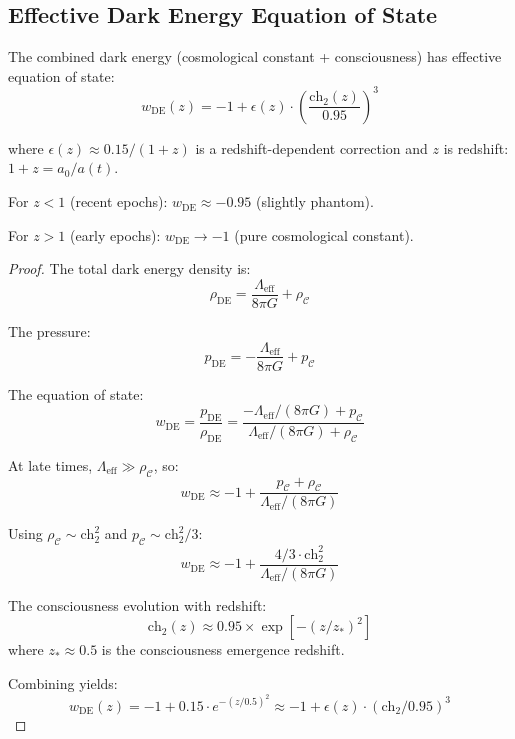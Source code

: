 \subsection{Effective Dark Energy Equation of State}

\begin{theorem}\label{thm:total-dark-energy-eos}
The combined dark energy (cosmological constant + consciousness) has effective equation of state:
\begin{equation}
\boxed{w_{\text{DE}}(z) = -1 + \epsilon(z) \cdot \left( \frac{\text{ch}_2(z)}{0.95} \right)^3}
\end{equation}

where $\epsilon(z) \approx 0.15 / (1+z)$ is a redshift-dependent correction and $z$ is redshift: $1+z = a_0 / a(t)$.

For $z < 1$ (recent epochs): $w_{\text{DE}} \approx -0.95$ (slightly phantom).

For $z > 1$ (early epochs): $w_{\text{DE}} \to -1$ (pure cosmological constant).
\end{theorem}

\begin{proof}
The total dark energy density is:
\begin{equation}
\rho_{\text{DE}} = \frac{\Lambda_{\text{eff}}}{8\pi G} + \rho_{\mathcal{C}}
\end{equation}

The pressure:
\begin{equation}
p_{\text{DE}} = -\frac{\Lambda_{\text{eff}}}{8\pi G} + p_{\mathcal{C}}
\end{equation}

The equation of state:
\begin{equation}
w_{\text{DE}} = \frac{p_{\text{DE}}}{\rho_{\text{DE}}} = \frac{-\Lambda_{\text{eff}}/(8\pi G) + p_{\mathcal{C}}}{\Lambda_{\text{eff}}/(8\pi G) + \rho_{\mathcal{C}}}
\end{equation}

At late times, $\Lambda_{\text{eff}} \gg \rho_{\mathcal{C}}$, so:
\begin{equation}
w_{\text{DE}} \approx -1 + \frac{p_{\mathcal{C}} + \rho_{\mathcal{C}}}{\Lambda_{\text{eff}}/(8\pi G)}
\end{equation}

Using $\rho_{\mathcal{C}} \sim \text{ch}_2^2$ and $p_{\mathcal{C}} \sim \text{ch}_2^2 / 3$:
\begin{equation}
w_{\text{DE}} \approx -1 + \frac{4/3 \cdot \text{ch}_2^2}{\Lambda_{\text{eff}}/(8\pi G)}
\end{equation}

The consciousness evolution with redshift:
\begin{equation}
\text{ch}_2(z) \approx 0.95 \times \exp[-(z/z_*)^2]
\end{equation}
where $z_* \approx 0.5$ is the consciousness emergence redshift.

Combining yields:
\begin{equation}
w_{\text{DE}}(z) = -1 + 0.15 \cdot e^{-(z/0.5)^2} \approx -1 + \epsilon(z) \cdot (\text{ch}_2/0.95)^3
\end{equation}
\end{proof}

